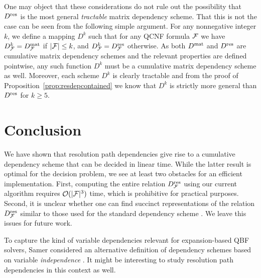 \documentclass{llncs}
\newcommand{\Dres}{D^{\text{\normalfont res}}}
\newcommand{\Dmat}{D^{\text{\normalfont mat}}}
\def\hy{\hbox{-}\nobreak\hskip0pt} \newcommand{\ellipsis}{$\dots$}
\newcommand{\Card}[1]{|#1|}
\begin{document}
One may object that these considerations do not rule out the possibility that
$\Dres$ is the most general \emph{tractable} matrix dependency scheme. That
this is not the case can be seen from the following simple argument. For any
nonnegative integer $k$, we define a mapping $D^k$ such that for any QCNF
formula $\mathcal{F}$ we have $D^k_{\FFF} = \Dmat_{\FFF}$ if $\Card{\FFF} \leq k$,
and $D^k_{\FFF} = \Dres_{\FFF}$ otherwise. As both $\Dmat$ and $\Dres$ are
cumulative matrix dependency schemes and the relevant properties are defined
pointwise, any such function $D^k$ must be a cumulative matrix dependency
scheme as well. Moreover, each scheme $D^k$ is clearly tractable and from the
proof of Proposition~\ref{prop:resdepcontained} we know that $D^k$ is strictly
more general than $\Dres$ for $k \geq 5$.
\section{Conclusion}
We have shown that resolution path dependencies give rise to a cumulative
dependency scheme that can be decided in linear time. While the latter result
is optimal for the decision problem, we see at least two obstacles for an
efficient implementation. First, computing the entire relation $\Dres_{\FFF}$
using our current algorithm requires $\mathcal{O}(\Card{\FFF}^3)$ time, which
is prohibitive for practical purposes. Second, it is unclear whether one can
find succinct representations of the relation $\Dres_{\FFF}$ similar to those
used for the standard dependency scheme \cite{LonsingBiere2009}. We leave this
issues for future work.

To capture the kind of variable dependencies relevant for expansion\hy based
QBF solvers, Samer considered an alternative definition of dependency schemes
based on variable \emph{independence} \cite{Samer08}. It might be interesting
to study resolution path dependencies in this context as well.
 
\end{document}

